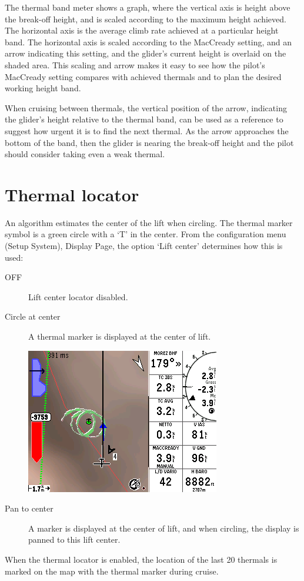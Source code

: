 \documentclass[a4paper,12pt]{refrep}
\begin{document}
The thermal band meter shows a graph, where the vertical axis is
height above the break-off height, and is scaled according to the
maximum height achieved.  The horizontal axis is the average climb
rate achieved at a particular height band.  The horizontal axis is
scaled according to the MacCready setting, and an arrow indicating this
setting, and the glider's current height is overlaid on the shaded
area.  This scaling and arrow makes it easy to see how the pilot's
MacCready setting compares with achieved thermals and to plan the
desired working height band.

When cruising between thermals, the vertical position of the arrow,
indicating the glider's height relative to the thermal band, can be
used as a reference to suggest how urgent it is to find the next
thermal.  As the arrow approaches the bottom of the band, then the
glider is nearing the break-off height and the pilot should consider
taking even a weak thermal.

\section{Thermal locator}
  An algorithm estimates the center of the lift when circling.  The
  thermal marker symbol is a green circle with a `T' in the center.
  From the configuration menu (Setup System), Display Page, the option
  `Lift center' determines how this is used:
\begin{description}
\item[OFF] Lift center locator disabled.
\item[Circle at center]  A thermal marker is displayed at the center of lift.

\begin{center}
\includegraphics[angle=0,width=\linewidth,keepaspectratio='true']{figures/shot-tlocator-circling.png}
\end{center}

\item[Pan to center] A marker is displayed at the center of lift, 
 and when circling, the display is panned to this lift center.
\end{description}
  When the thermal locator is enabled, the location of the last 20
  thermals is marked on the map with the thermal marker during cruise.
\end{document}
